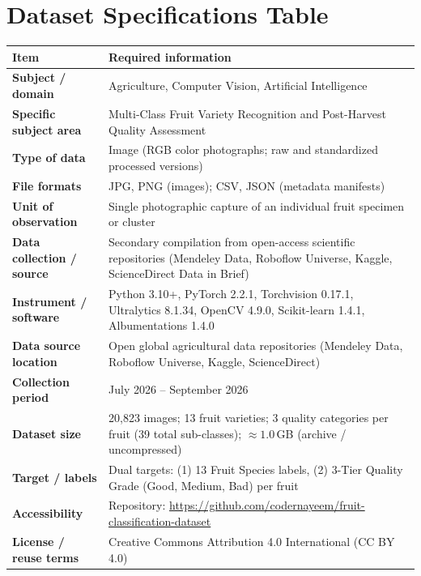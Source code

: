 \documentclass[11pt,a4paper]{article}
\begin{document}
\section{Dataset Specifications Table}
\noindent
\begin{tabularx}{\textwidth}{|p{4.2cm}|X|}
\hline
\textbf{Item} & \textbf{Required information} \\
\hline
\textbf{Subject / domain} & Agriculture, Computer Vision, Artificial Intelligence \\
\hline
\textbf{Specific subject area} & Multi-Class Fruit Variety Recognition and Post-Harvest Quality Assessment \\
\hline
\textbf{Type of data} & Image (RGB color photographs; raw and standardized processed versions) \\
\hline
\textbf{File formats} & JPG, PNG (images); CSV, JSON (metadata manifests) \\
\hline
\textbf{Unit of observation} & Single photographic capture of an individual fruit specimen or cluster \\
\hline
\textbf{Data collection / source} & Secondary compilation from open-access scientific repositories (Mendeley Data, Roboflow Universe, Kaggle, ScienceDirect Data in Brief) \\
\hline
\textbf{Instrument / software} & Python 3.10+, PyTorch 2.2.1, Torchvision 0.17.1, Ultralytics 8.1.34, OpenCV 4.9.0, Scikit-learn 1.4.1, Albumentations 1.4.0 \\
\hline
\textbf{Data source location} & Open global agricultural data repositories (Mendeley Data, Roboflow Universe, Kaggle, ScienceDirect) \\
\hline
\textbf{Collection period} & July 2026 -- September 2026 \\
\hline
\textbf{Dataset size} & 20,823 images; 13 fruit varieties; 3 quality categories per fruit (39 total sub-classes); $\approx 1.0$\,GB (archive / uncompressed) \\
\hline
\textbf{Target / labels} & Dual targets: (1) 13 Fruit Species labels, (2) 3-Tier Quality Grade (Good, Medium, Bad) per fruit \\
\hline
\textbf{Accessibility} & Repository: \url{https://github.com/codernayeem/fruit-classification-dataset} \\
\hline
\textbf{License / reuse terms} & Creative Commons Attribution 4.0 International (CC BY 4.0) \\
\hline
\end{tabularx}
\label{tab:dataset-specs}
\end{document}
